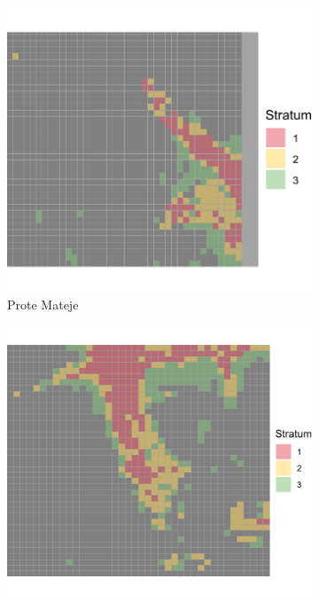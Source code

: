 \documentclass[a4paper,12pt]{article}
\begin{document}
\begin{figure}[H]
	\centering
  
	\begin{subfigure}[b]{0.3\textwidth}
	  \centering
	  \includegraphics[width=\textwidth]{../outputs/grid_output/strata_viz/prote-mateje_strata.png}
	  \caption{Prote Mateje}
	  \label{fig:prote-mateje}
	\end{subfigure}
	\hfill
	\begin{subfigure}[b]{0.3\textwidth}
	  \centering
	  \includegraphics[width=\textwidth]{../outputs/grid_output/strata_viz/nemanjina_strata.png}

\end{subfigure}
\end{figure}
\end{document}
